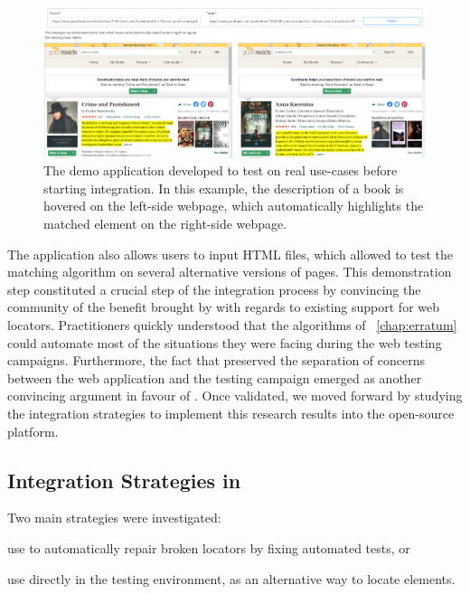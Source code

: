 \begin{figure}[]
    \centering
    \includegraphics[width=\linewidth]{cerberus/explanations/demo_matching}
    \caption{The demo application developed to test \erratum on real use-cases before starting integration. In this example, the description of a book is hovered on the left-side webpage, which automatically highlights the matched element on the right-side webpage.}
    \label{cerberus:fig:demo_app}
\end{figure}

The application also allows users to input HTML files, which allowed to test the matching algorithm on several alternative versions of pages.
This demonstration step constituted a crucial step of the integration process by convincing the \cerberus community of the benefit brought by \erratum with regards to existing support for web locators.
Practitioners quickly understood that the algorithms of \erratum~\ref{chap:erratum} could automate most of the situations they were facing during the web testing campaigns.
Furthermore, the fact that \erratum preserved the separation of concerns between the web application and the testing campaign emerged as another convincing argument in favour of \erratum.
Once validated, we moved forward by studying the integration strategies to implement this research results into the open-source platform.

\subsection{Integration Strategies in \cerberus}
Two main strategies were investigated:
\begin{inparaenum}[\em (i)]
\item use \erratum to automatically repair broken locators by fixing automated tests, or
\item use \erratum directly in the \cerberus testing environment, as an alternative way to locate elements.
\end{inparaenum}

